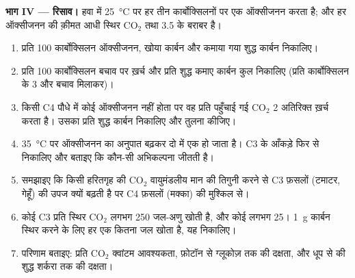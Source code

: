 \begin{problem}
\medskip
\noindent\textbf{भाग IV --- रिसाव।}
हवा में \qty{25}{\celsius} पर  हर तीन कार्बोक्सिलनों पर एक
ऑक्सीजनन करता है; और हर ऑक्सीजनन की क़ीमत आधी स्थिर
$\mathrm{CO_2}$ तथा 3.5  के बराबर है।
\begin{enumerate}[resume]
  \item प्रति 100 कार्बोक्सिलन ऑक्सीजनन, खोया कार्बन और कमाया गया
        शुद्ध कार्बन निकालिए।
  \item प्रति 100 कार्बोक्सिलन बचाव पर ख़र्च  और प्रति शुद्ध कमाए
        कार्बन कुल  निकालिए (प्रति कार्बोक्सिलन  के 3
         और बचाव मिलाकर)।
  \item किसी C4 पौधे में कोई ऑक्सीजनन नहीं होता पर वह प्रति पहुँचाई गई
        $\mathrm{CO_2}$ 2 अतिरिक्त  ख़र्च करता है। उसका प्रति शुद्ध
        कार्बन  निकालिए और तुलना कीजिए।
  \item \qty{35}{\celsius} पर ऑक्सीजनन का अनुपात बढ़कर दो में एक हो
        जाता है। C3 के आँकड़े फिर से निकालिए और बताइए कि कौन-सी
        अभिकल्पना जीतती है।
  \item समझाइए कि किसी हरितगृह की $\mathrm{CO_2}$ वायुमंडलीय मान की
        तिगुनी करने से C3 फ़सलों (टमाटर, गेहूँ) की उपज क्यों बढ़ती है
        पर C4 फ़सलों (मक्का) की मुश्किल से।
  \item कोई C3  प्रति स्थिर $\mathrm{CO_2}$ लगभग 250 जल-अणु खोती
        है, और कोई  लगभग 25। \qty{1}{g} कार्बन स्थिर करने के
        लिए हर एक कितना जल खोता है, यह निकालिए।
  \item परिणाम बताइए: प्रति $\mathrm{CO_2}$ क्वांटम आवश्यकता,
        फ़ोटॉन से ग्लूकोज़ तक की दक्षता, और धूप से  की शुद्ध
        शर्करा तक की दक्षता।
\end{enumerate}
\end{problem}
